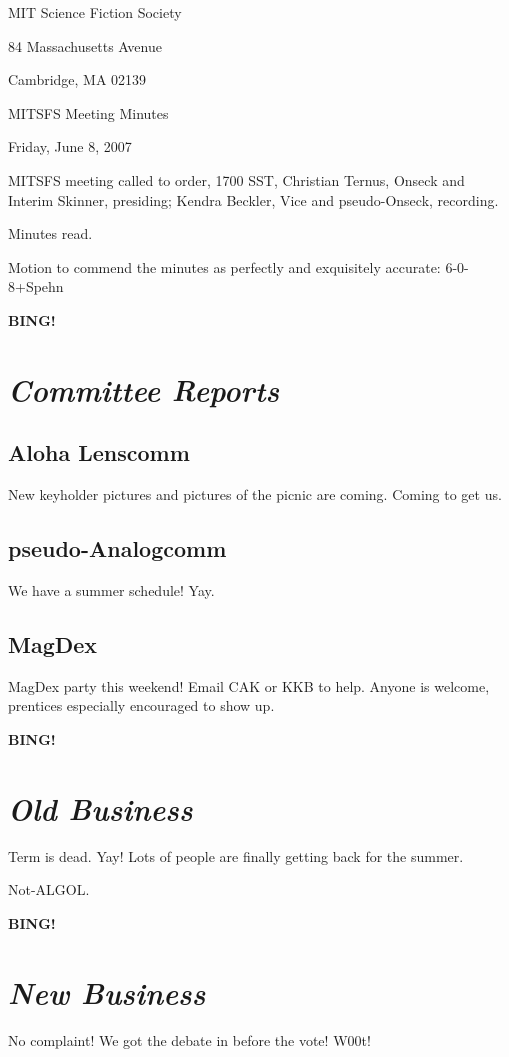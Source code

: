 \documentclass[10pt]{article}
\newcommand{\bing}{{\bf BING!} }
\newcommand{\goto}[1]{\bing \vskip 12pt \section*{{\em{#1}}}}
\begin{document}
\begin{center}

MIT Science Fiction Society

84 Massachusetts Avenue

Cambridge, MA 02139

\vspace{12pt}

MITSFS Meeting Minutes

Friday, June 8, 2007

\end{center}

\vspace{18pt}

\setlength{\parskip}{6pt}

\noindent
MITSFS meeting called to order, 1700 SST,
Christian Ternus, Onseck and Interim Skinner, presiding; Kendra Beckler, Vice and pseudo-Onseck, recording.

Minutes read.

Motion to commend the minutes as perfectly and exquisitely accurate: 6-0-8+Spehn

\goto{Committee Reports}

\subsection*{Aloha Lenscomm}

New keyholder pictures and pictures of the picnic are coming.  Coming to get us.

\subsection*{pseudo-Analogcomm}

We have a summer schedule!  Yay.

\subsection*{MagDex}

MagDex party this weekend!  Email CAK or KKB to help.  Anyone is welcome, prentices especially encouraged to show up.

\goto{Old Business}

Term is dead.  Yay!  Lots of people are finally getting back for the summer.

Not-ALGOL.

\goto{New Business}

No complaint!  We got the debate in before the vote!  W00t!
\end{document}
